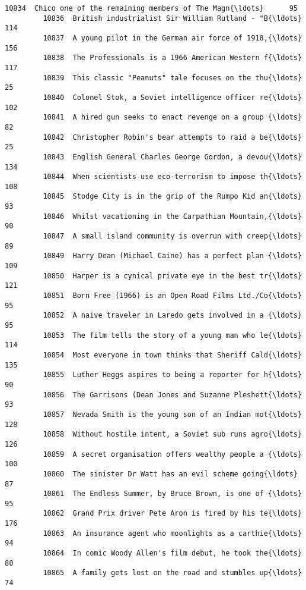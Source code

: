 \documentclass[11pt]{article}
\begin{document}
\begin{Verbatim}[commandchars=\\\{\}]
         10834  Chico one of the remaining members of The Magn{\ldots}      95   
         10836  British industrialist Sir William Rutland - "B{\ldots}     114   
         10837  A young pilot in the German air force of 1918,{\ldots}     156   
         10838  The Professionals is a 1966 American Western f{\ldots}     117   
         10839  This classic "Peanuts" tale focuses on the thu{\ldots}      25   
         10840  Colonel Stok, a Soviet intelligence officer re{\ldots}     102   
         10841  A hired gun seeks to enact revenge on a group {\ldots}      82   
         10842  Christopher Robin's bear attempts to raid a be{\ldots}      25   
         10843  English General Charles George Gordon, a devou{\ldots}     134   
         10844  When scientists use eco-terrorism to impose th{\ldots}     108   
         10845  Stodge City is in the grip of the Rumpo Kid an{\ldots}      93   
         10846  Whilst vacationing in the Carpathian Mountain,{\ldots}      90   
         10847  A small island community is overrun with creep{\ldots}      89   
         10849  Harry Dean (Michael Caine) has a perfect plan {\ldots}     109   
         10850  Harper is a cynical private eye in the best tr{\ldots}     121   
         10851  Born Free (1966) is an Open Road Films Ltd./Co{\ldots}      95   
         10852  A naive traveler in Laredo gets involved in a {\ldots}      95   
         10853  The film tells the story of a young man who le{\ldots}     114   
         10854  Most everyone in town thinks that Sheriff Cald{\ldots}     135   
         10855  Luther Heggs aspires to being a reporter for h{\ldots}      90   
         10856  The Garrisons (Dean Jones and Suzanne Pleshett{\ldots}      93   
         10857  Nevada Smith is the young son of an Indian mot{\ldots}     128   
         10858  Without hostile intent, a Soviet sub runs agro{\ldots}     126   
         10859  A secret organisation offers wealthy people a {\ldots}     100   
         10860  The sinister Dr Watt has an evil scheme going{\ldots}      87   
         10861  The Endless Summer, by Bruce Brown, is one of {\ldots}      95   
         10862  Grand Prix driver Pete Aron is fired by his te{\ldots}     176   
         10863  An insurance agent who moonlights as a carthie{\ldots}      94   
         10864  In comic Woody Allen's film debut, he took the{\ldots}      80   
         10865  A family gets lost on the road and stumbles up{\ldots}      74   
         

\end{Verbatim}
\end{document}

